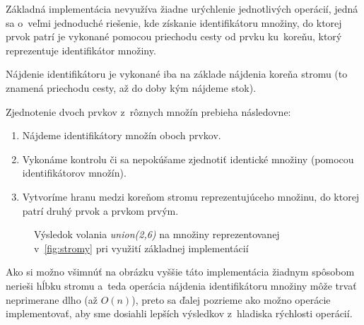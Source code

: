 Základná implementácia nevyužíva žiadne urýchlenie jednotlivých operácií, jedná sa o~veľmi jednoduché riešenie, kde získanie identifikátoru množiny, do ktorej prvok patrí je vykonané pomocou priechodu cesty od prvku ku~koreňu, ktorý reprezentuje identifikátor množiny. 

Nájdenie identifikátoru je vykonané iba na základe nájdenia koreňa stromu (to znamená priechodu cesty, až do doby kým nájdeme stok).

Zjednotenie dvoch prvkov z~rôznych množín prebieha následovne:

\begin{enumerate}
    \item Nájdeme identifikátory množín oboch prvkov.
    \item Vykonáme kontrolu či sa nepokúšame zjednotiť identické množiny (pomocou identifikátorov množín).
    \item Vytvoríme hranu medzi koreňom stromu reprezentujúceho množinu, do ktorej patrí druhý prvok a prvkom prvým.
\end{enumerate}

\begin{figure}[H]
    \centering
    \captionsetup{justification=centering}
         
    \caption{Výsledok volania \emph{union(2,6)} na množiny reprezentovanej v~\ref{fig:stromy} pri využití základnej implementácií}
    \label{fig:priklad_zakladna_implementacia}
\end{figure}

Ako si možno všimnúť na obrázku vyššie táto implementácia žiadnym spôsobom nerieši hĺbku stromu a~teda operácia nájdenia identifikátoru množiny môže trvať neprimerane dlho (až $O(n)$), preto sa ďalej pozrieme ako možno operácie implementovať, aby sme dosiahli lepších výsledkov z~hladiska rýchlosti operácií.

